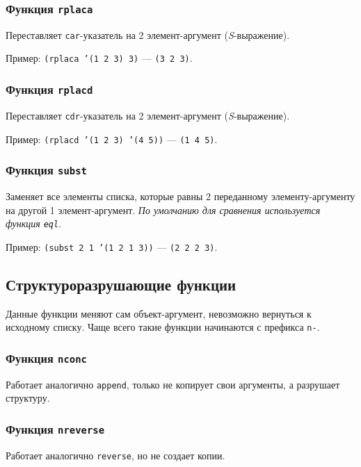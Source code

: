 \subsubsection*{Функция \texttt{rplaca}}

Переставляет \texttt{car}-указатель на 2 элемент-аргумент (\textit{S}-выражение).

Пример: \texttt{(rplaca '(1 2 3) 3)} --- \texttt{(3 2 3)}.

\subsubsection*{Функция \texttt{rplacd}}

Переставляет \texttt{cdr}-указатель на 2 элемент-аргумент (\textit{S}-выражение).

Пример: \texttt{(rplacd '(1 2 3) '(4 5))} --- \texttt{(1 4 5)}.

\subsubsection*{Функция \texttt{subst}}

Заменяет все элементы списка, которые равны 2 переданному элементу-аргументу на другой 1 элемент-аргумент. \textit{По умолчанию для сравнения используется функция \texttt{eql}}.

Пример: \texttt{(subst 2 1 '(1 2 1 3))} --- \texttt{(2 2 2 3)}.

\subsection*{Структуроразрушающие функции}

Данные функции меняют сам объект-аргумент, невозможно вернуться к исходному списку. Чаще всего такие функции начинаются с префикса \texttt{n-}.

\subsubsection*{Функция \texttt{nconc}}

Работает аналогично \texttt{append}, только не копирует свои аргументы, а разрушает структуру.

\subsubsection*{Функция \texttt{nreverse}}

Работает аналогично \texttt{reverse}, но не создает копии.

